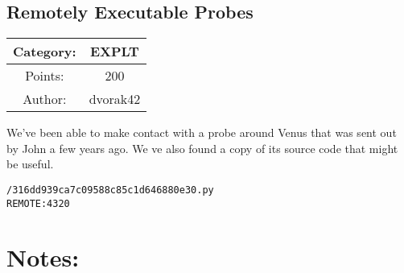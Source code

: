 \begin{center}
\section*{Remotely Executable Probes}
{\large
\begin{tabular}{| c c |}
\hline
Category: & EXPLT\\\hline
Points: & 200\\\hline
Author: & dvorak42\\\hline
\end{tabular}
}
\end{center}
\vspace{0.5in}

{\large
We've been able to make contact with a probe around Venus that was sent out by John a few years ago. We
ve also found a copy of its source code that might be useful.
}
\vspace{0.25in}
\begin{center}
  {\Large\tt /316dd939ca7c09588c85c1d646880e30.py}\\
  {\Large\tt REMOTE:4320}
\end{center}

\vspace{0.25in}
\section*{Notes:}
